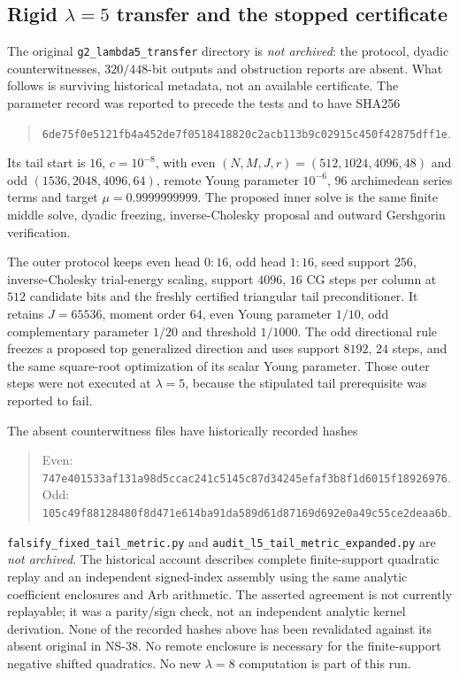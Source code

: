 \documentclass[11pt]{article}
\theoremstyle{remark}
\begin{document}
\subsection*{Rigid $\lambda=5$ transfer and the stopped certificate}
\label{app:v127-transfer}
The original \texttt{g2\_lambda5\_transfer} directory is \emph{not
archived}: the protocol, dyadic counterwitnesses, $320/448$-bit outputs
and obstruction reports are absent. What follows is surviving historical
metadata, not an available certificate. The parameter record was reported
to precede the tests and to have SHA256
\begin{quote}\small\nolinkurl{6de75f0e5121fb4a452de7f0518418820c2acb113b9c02915c450f42875dff1e}.\end{quote}
Its tail start is $16$, $c=10^{-8}$, with even $(N,M,J,r)=(512,1024,4096,48)$
and odd $(1536,2048,4096,64)$, remote Young parameter $10^{-6}$,
$96$ archimedean series terms and target $\mu=0.9999999999$.
The proposed inner solve is the same finite middle solve, dyadic
freezing, inverse-Cholesky proposal and outward Gershgorin verification.

The outer protocol keeps even head $0{:}16$, odd head $1{:}16$, seed
support $256$, inverse-Cholesky trial-energy scaling, support $4096$,
$16$ CG steps per column at $512$ candidate bits and the freshly
certified triangular tail preconditioner. It retains $J=65536$, moment
order $64$, even Young parameter $1/10$, odd complementary parameter
$1/20$ and threshold $1/1000$. The odd directional rule freezes a
proposed top generalized direction and uses support $8192$, $24$ steps,
and the same square-root optimization of its scalar Young parameter.
Those outer steps were not executed at $\lambda=5$, because the
stipulated tail prerequisite was reported to fail.

The absent counterwitness files have historically recorded hashes
\begin{quote}\small
Even: \nolinkurl{747e401533af131a98d5ccac241c5145c87d34245efaf3b8f1d6015f18926976}.\\
Odd: \nolinkurl{105c49f88128480f8d471e614ba91da589d61d87169d692e0a49c55ce2deaa6b}.
\end{quote}
\nolinkurl{falsify_fixed_tail_metric.py} and
\nolinkurl{audit_l5_tail_metric_expanded.py} are \emph{not archived}.
The historical account describes complete finite-support quadratic
replay and an independent signed-index assembly using the same analytic
coefficient enclosures and Arb arithmetic. The asserted agreement is
not currently replayable; it was a parity/sign check, not an independent
analytic kernel derivation. None of the recorded hashes above has been
revalidated against its absent original in NS-38.
No remote enclosure is necessary for the finite-support negative
shifted quadratics. No new $\lambda=8$ computation is part of this run.
\end{document}
